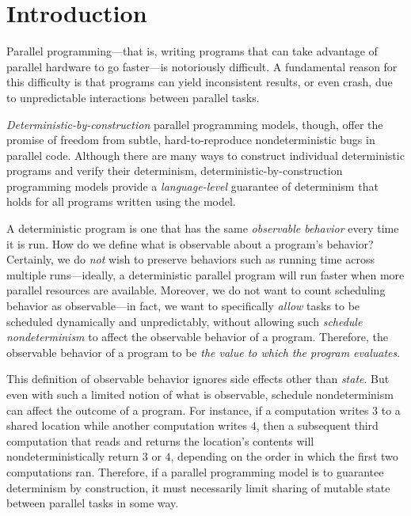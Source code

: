 \chapter{Introduction}\label{ch:intro} %

Parallel programming---that is, writing programs that can take
advantage of parallel hardware to go faster---is notoriously
difficult.  A fundamental reason for this difficulty is that programs
can yield inconsistent results, or even crash, due to unpredictable
interactions between parallel tasks.

\emph{Deterministic-by-construction} parallel programming models,
though, offer the promise of freedom from subtle, hard-to-reproduce
nondeterministic bugs in parallel code. Although there are many ways to
construct individual deterministic programs and verify their
determinism, deterministic-by-construction programming models provide
a \emph{language-level} guarantee of determinism
that holds for all programs written using the model.

A deterministic program is one that has the same \emph{observable
  behavior} every time it is run.  How do we define what is observable
about a program's behavior?  Certainly, we do \emph{not} wish to
preserve behaviors such as running time across multiple
runs---ideally, a deterministic parallel program will run faster when
more parallel resources are available.  Moreover, we do not want to
count scheduling behavior as observable---in fact, we want to
specifically \emph{allow} tasks to be scheduled dynamically and
unpredictably, without allowing such \emph{schedule nondeterminism} to
affect the observable behavior of a program.  Therefore,  the observable behavior of a program to be
\emph{the value to which the program evaluates}.


This definition of observable behavior ignores side effects other than
\emph{state}.  But even with such a limited notion of what is
observable, schedule nondeterminism can affect the outcome of a
program.  For instance, if a computation writes $3$ to a shared
location while another computation writes $4$, then a subsequent third
computation that reads and returns the location's contents will
nondeterministically return $3$ or $4$, depending on the order in
which the first two computations ran.  Therefore, if a parallel
programming model is to guarantee determinism by construction, it must
necessarily limit sharing of mutable state between parallel tasks in
some way.

